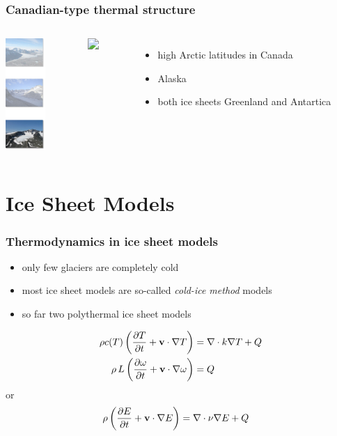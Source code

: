 \documentclass[hide notes,intlimits,handout]{beamer}
\newcommand{\ddt}[1]{\ensuremath{\frac{\partial #1}{\partial t}}}
\begin{document}
\begin{frame}
 \frametitle{Canadian-type thermal structure}
  \begin{columns}
    \column[T]{1.75cm} 
    \vspace{1cm}
    {\includegraphics[width=1.5cm]{figures/glaciersv_p}}%
    \vspace{2.5cm}
    \column[T]{10.25cm}
    \begin{figure}
      \includegraphics<1>[width=10cm]{figures/CTSstructures-2land}
    \end{figure}
    \begin{itemize}
    \item high Arctic latitudes in Canada
    \item Alaska
    \item both ice sheets Greenland and Antartica
    \end{itemize}
  \end{columns}
\end{frame}



\section{Ice Sheet Models}


\begin{frame}
  \frametitle{Thermodynamics in ice sheet models}
  \begin{itemize}
  \item only few glaciers are completely cold
  \item most ice sheet models are so-called \emph{cold-ice method} models
  \item so far two polythermal ice sheet models
  \end{itemize}
      \begin{align*}
       \rho c(T)\left(\ddt{T} + {\bf v}\cdot\nabla T\right) & =  \nabla \cdot k \nabla T + Q \\
       \rho\,L\left(\ddt{\omega} + {\bf v}\cdot\nabla \omega \right) & =   Q
      \end{align*}
      or
     \begin{align*}
       \rho \left(\ddt{E} + {\bf v}\cdot\nabla E\right) & =  \nabla \cdot \nu \nabla E + Q
     \end{align*}
\end{frame}
\end{document}
